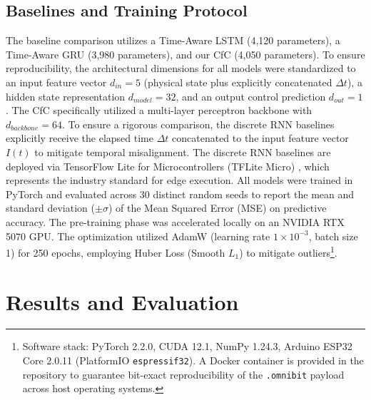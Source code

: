\documentclass[conference]{IEEEtran}
\begin{document}
\subsection{Baselines and Training Protocol}
The baseline comparison utilizes a Time-Aware LSTM (4,120 parameters), a Time-Aware GRU (3,980 parameters), and our CfC (4,050 parameters). To ensure reproducibility, the architectural dimensions for all models were standardized to an input feature vector $d_{in} = 5$ (physical state plus explicitly concatenated $\Delta t$), a hidden state representation $d_{model} = 32$, and an output control prediction $d_{out} = 1$. The CfC specifically utilized a multi-layer perceptron backbone with $d_{backbone} = 64$. To ensure a rigorous comparison, the discrete RNN baselines explicitly receive the elapsed time $\Delta t$ concatenated to the input feature vector $I(t)$ to mitigate temporal misalignment. The discrete RNN baselines are deployed via TensorFlow Lite for Microcontrollers (TFLite Micro) \cite{david2021tflitemicro}, which represents the industry standard for edge execution. All models were trained in PyTorch and evaluated across 30 distinct random seeds to report the mean and standard deviation ($\pm \sigma$) of the Mean Squared Error (MSE) on predictive accuracy. The pre-training phase was accelerated locally on an NVIDIA RTX 5070 GPU. The optimization utilized AdamW \cite{kingma2014adam, loshchilov2017decoupled} (learning rate $1\times10^{-3}$, batch size 1) for 250 epochs, employing Huber Loss (Smooth $L_1$) to mitigate outliers\footnote{Software stack: PyTorch 2.2.0, CUDA 12.1, NumPy 1.24.3, Arduino ESP32 Core 2.0.11 (PlatformIO \texttt{espressif32}). A Docker container is provided in the repository to guarantee bit-exact reproducibility of the \texttt{.omnibit} payload across host operating systems.}.

\section{Results and Evaluation}
\end{document}
